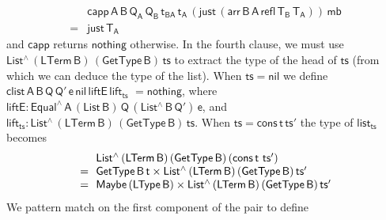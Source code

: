 \documentclass[sigplan,10pt,anonymous,review]{acmart}
\begin{document}
\[\begin{array}{ll}
 & \!\!\mathsf{capp\, A \,B \, Q_A \, Q_B \, t_{BA}\, t_A \, (just \,
  (arr\, B \,A\, refl\, T_B\, T_A))\, mb}\\ 
= & \!\!\mathsf{just\, T_A}
\end{array}\]
and $\mathsf{capp}$ returns $\mathsf{nothing}$ otherwise.  In the
fourth clause, we must use $\mathsf{List^{\wedge}\, (LTerm\, B)\,
  (GetType\, B)\, ts}$ to extract the type of the head of
$\mathsf{ts}$ (from which we can deduce the type of the list). When
$\mathsf{ts} = \mathsf{nil}$ we define $\mathsf{clist\, A\, B\, Q\,
  Q'\, e\, nil \, liftE\, lift_{ts}}$ $\mathsf{= nothing}$, where
$\mathsf{liftE : Equal^{\wedge}\, A\, (List\,B) \, Q\,
  (List^{\wedge}\, B\, Q')\, e}$, and $\mathsf{lift_{ts} :
  List^{\wedge}\, (LTerm\, B)\, (GetType\, B)\, ts}$.  When
$\mathsf{ts} = \mathsf{cons\,t\,ts'}$
the type of $\mathsf{list_{ts}}$ becomes
\[\begin{array}{ll}
& \!\!\mathsf{List^{\wedge}\, (LTerm\, B)\, (GetType\, B)\, (cons\, t}$
$\mathsf{ts')}\\
= & \!\!\mathsf{GetType\, B\, t \times List^{\wedge}\, (LTerm\, B)\,
  (GetType\, B)\, ts'}\\
= & \!\! \mathsf{Maybe\, (LType\, B) \times List^{\wedge}\, (LTerm\, B)\,
  (GetType\, B)\, ts'}
\end{array}\] We pattern match on the first component
of the pair to define
\end{document}
